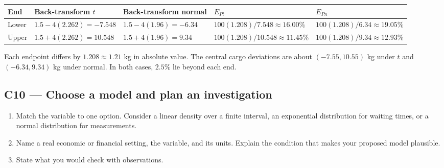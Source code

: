{\small
\begin{tabularx}{\linewidth}{@{}l Y Y l l@{}}
\toprule
\textbf{End} & \textbf{Back-transform \(t\)} & \textbf{Back-transform normal} & \textbf{\(E_{Pt}\)} & \textbf{\(E_{Pn}\)}\\
\midrule
Lower & \(1.5-4(2.262)=-7.548\) & \(1.5-4(1.96)=-6.34\) &
\(100(1.208)/7.548\approx16.00\%\) & \(100(1.208)/6.34\approx19.05\%\)\\
Upper & \(1.5+4(2.262)=10.548\) & \(1.5+4(1.96)=9.34\) &
\(100(1.208)/10.548\approx11.45\%\) & \(100(1.208)/9.34\approx12.93\%\)\\
\bottomrule
\end{tabularx}
}
\par\smallskip Each endpoint differs by \(1.208\approx1.21\) kg in absolute value. The central cargo deviations are about \((-7.55,10.55)\) kg under \(t\) and \((-6.34,9.34)\) kg under normal. In both cases, \(2.5\%\) lie beyond each end.
\par\nobreak\vspace{6pt}

\clearpage
\subsection{C10 --- Choose a model and plan an investigation}\label{crit:c10}
\begin{enumerate}
  \item Match the variable to one option. Consider a linear density over a finite interval, an exponential distribution for waiting times, or a normal distribution for measurements.
  \item Name a real economic or financial setting, the variable, and its units. Explain the condition that makes your proposed model plausible.
  \item State what you would check with observations. 
\end{enumerate}


